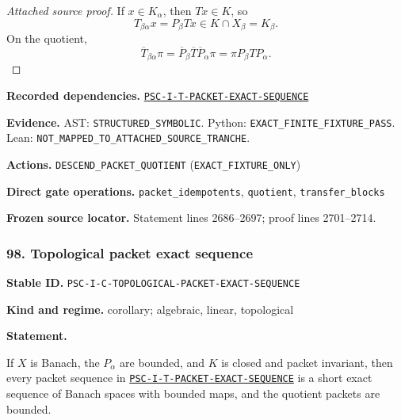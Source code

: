 \documentclass[a4paper,11pt]{article}
\newcommand{\field}[2]{\noindent\textbf{#1.} #2\par}
\begin{document}
\begin{proof}[Attached source proof]
If $x\in K_\alpha$, then $Tx\in K$, so
\[
T_{\beta\alpha}x=P_\beta Tx\in K\cap X_\beta=K_\beta.
\]
On the quotient,
\[
\overline T_{\beta\alpha}\pi
=
\overline P_\beta\overline T\overline P_\alpha\pi
=
\pi P_\beta TP_\alpha.
\]
\end{proof}
\field{Recorded dependencies}{\hyperref[rec:PSC-I-T-PACKET-EXACT-SEQUENCE]{\nolinkurl{PSC-I-T-PACKET-EXACT-SEQUENCE}}}
\field{Evidence}{AST: \nolinkurl{STRUCTURED_SYMBOLIC}. Python: \nolinkurl{EXACT_FINITE_FIXTURE_PASS}. Lean: \nolinkurl{NOT_MAPPED_TO_ATTACHED_SOURCE_TRANCHE}.}
\field{Actions}{\nolinkurl{DESCEND_PACKET_QUOTIENT} (\nolinkurl{EXACT_FIXTURE_ONLY})}
\field{Direct gate operations}{\nolinkurl{packet_idempotents}, \nolinkurl{quotient}, \nolinkurl{transfer_blocks}}
\field{Frozen source locator}{Statement lines 2686--2697; proof lines 2701--2714.}
\subsubsection*{98. Topological packet exact sequence}
\label{rec:PSC-I-C-TOPOLOGICAL-PACKET-EXACT-SEQUENCE}
\field{Stable ID}{\nolinkurl{PSC-I-C-TOPOLOGICAL-PACKET-EXACT-SEQUENCE}}
\field{Kind and regime}{corollary; algebraic, linear, topological}
\textbf{Statement.}\par
If $X$ is Banach, the $P_\alpha$ are bounded, and $K$ is closed and packet invariant, then every packet sequence in \hyperref[rec:PSC-I-T-PACKET-EXACT-SEQUENCE]{\nolinkurl{PSC-I-T-PACKET-EXACT-SEQUENCE}} is a short exact sequence of Banach spaces with bounded maps, and the quotient packets are bounded.
\end{document}
